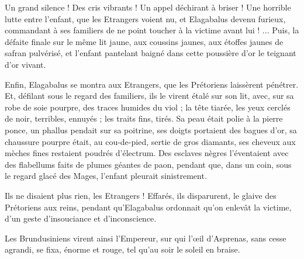 \documentclass[a4paper, 11pt, oneside, polutonikogreek, french]{article}
\begin{document}
Un grand silence ! Des cris vibrants ! Un appel déchirant à briser ! Une horrible lutte entre l'enfant, que les Etrangers voient nu, et Elagabalus devenu furieux, commandant à ses familiers de ne point toucher à la victime avant lui ! ... Puis, la défaite finale sur le même lit jaune, aux coussins jaunes, aux étoffes jaunes de safran pulvérisé, et l'enfant pantelant baigné dans cette poussière d'or le teignant d'or vivant.

Enfin, Elagabalus se montra aux Etrangers, que les Prétoriens laissèrent pénétrer. Et, défilant sous le regard des familiers, ils le virent étalé sur son lit, avec, sur sa robe de soie pourpre, des traces humides du viol ; la tête tiarée, les yeux cerclés de noir, terribles, ennuyés ; les traits fins, tirés. Sa peau était polie à la pierre ponce, un phallus pendait sur sa poitrine, ses doigts portaient des bagues d'or, sa chaussure pourpre était, au cou-de-pied, sertie de gros diamants, ses cheveux aux mèches fines restaient poudrés d'électrum. Des esclaves nègres l'éventaient avec des flabellums faits de plumes géantes de paon, pendant que, dans un coin, sous le regard glacé des Mages, l'enfant pleurait sinistrement.

Ils ne disaient plus rien, les Etrangers ! Effarés, ils disparurent, le glaive des Prétoriens aux reins, pendant qu'Elagabalus ordonnait qu'on enlevât la victime, d'un geste d'insouciance et d'inconscience.

Les Brundusiniens virent ainsi l'Empereur, sur qui l'œil d'Asprenas, sans cesse agrandi, se fixa, énorme et rouge, tel qu'au soir le soleil en braise.
\clearpage
\subsection{}
\end{document}
